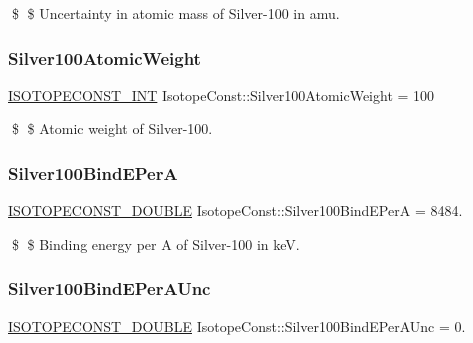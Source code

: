 \$ \$ Uncertainty in atomic mass of Silver-\/100 in amu. \mbox{\label{group___isotope_const-_silver-_ag100_ga1cb556e29639f852f306cc8c39c8d817}} 
\subsubsection{\texorpdfstring{Silver100\+Atomic\+Weight}{Silver100AtomicWeight}}
{\footnotesize\ttfamily \mbox{\hyperlink{group___isotope_const-_macros_ga5f18360b3e99483a35c32d789e62621c}{I\+S\+O\+T\+O\+P\+E\+C\+O\+N\+S\+T\+\_\+\+I\+NT}} Isotope\+Const\+::\+Silver100\+Atomic\+Weight = 100}

\$ \$ Atomic weight of Silver-\/100. \mbox{\label{group___isotope_const-_silver-_ag100_ga91740c93bff3c4cba9dbce53ebace8f3}} 
\subsubsection{\texorpdfstring{Silver100\+Bind\+E\+PerA}{Silver100BindEPerA}}
{\footnotesize\ttfamily \mbox{\hyperlink{group___isotope_const-_macros_ga8f45a7272ce02c0b4c65c44636ed719a}{I\+S\+O\+T\+O\+P\+E\+C\+O\+N\+S\+T\+\_\+\+D\+O\+U\+B\+LE}} Isotope\+Const\+::\+Silver100\+Bind\+E\+PerA = 8484.}

\$ \$ Binding energy per A of Silver-\/100 in keV. \mbox{\label{group___isotope_const-_silver-_ag100_ga85386bef58430822c147bb20be53aa85}} 
\subsubsection{\texorpdfstring{Silver100\+Bind\+E\+Per\+A\+Unc}{Silver100BindEPerAUnc}}
{\footnotesize\ttfamily \mbox{\hyperlink{group___isotope_const-_macros_ga8f45a7272ce02c0b4c65c44636ed719a}{I\+S\+O\+T\+O\+P\+E\+C\+O\+N\+S\+T\+\_\+\+D\+O\+U\+B\+LE}} Isotope\+Const\+::\+Silver100\+Bind\+E\+Per\+A\+Unc = 0.}

